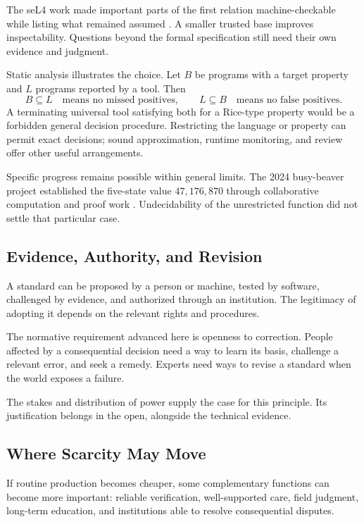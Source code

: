 The seL4 work made important parts of the first relation machine-checkable while listing what remained assumed \cite{klein2009sel4}. A smaller trusted base improves inspectability. Questions beyond the formal specification still need their own evidence and judgment.

Static analysis illustrates the choice. Let $B$ be programs with a target property and $L$ programs reported by a tool. Then
\begin{equation}
 B\subseteq L\quad\text{means no missed positives},
 \qquad
 L\subseteq B\quad\text{means no false positives}.
\end{equation}
A terminating universal tool satisfying both for a Rice-type property would be a forbidden general decision procedure. Restricting the language or property can permit exact decisions; sound approximation, runtime monitoring, and review offer other useful arrangements.

Specific progress remains possible within general limits. The 2024 busy-beaver project established the five-state value $47{,}176{,}870$ through collaborative computation and proof work \cite{bbchallenge2024}. Undecidability of the unrestricted function did not settle that particular case.

\subsection{Evidence, Authority, and Revision}

A standard can be proposed by a person or machine, tested by software, challenged by evidence, and authorized through an institution. The legitimacy of adopting it depends on the relevant rights and procedures.

The normative requirement advanced here is openness to correction. People affected by a consequential decision need a way to learn its basis, challenge a relevant error, and seek a remedy. Experts need ways to revise a standard when the world exposes a failure.

The stakes and distribution of power supply the case for this principle. Its justification belongs in the open, alongside the technical evidence.

\subsection{Where Scarcity May Move}

If routine production becomes cheaper, some complementary functions can become more important: reliable verification, well-supported care, field judgment, long-term education, and institutions able to resolve consequential disputes.

